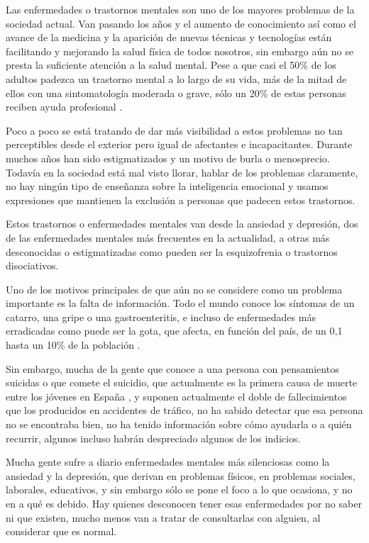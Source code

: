 \documentclass[12pt, a4paper,twoside,titlepage]{book}
\begin{document}
Las enfermedades o trastornos mentales son uno de los mayores problemas de la sociedad actual. Van pasando los años y el aumento de conocimiento así como el avance de la medicina y la aparición de nuevas técnicas y tecnologías están facilitando y mejorando la salud física de todos nosotros, sin embargo aún no se presta la suficiente atención a la salud mental. Pese a que casi el 50\% de los adultos padezca un trastorno mental a lo largo de su vida, más de la mitad de ellos con una sintomatología moderada o grave, sólo un 20\% de estas personas reciben ayuda profesional \cite{articuloIntro1}. 

Poco a poco se está tratando de dar más visibilidad a estos problemas no tan perceptibles desde el exterior pero igual de afectantes e incapacitantes. Durante muchos años han sido estigmatizados y un motivo de burla o menosprecio. Todavía en la sociedad está mal visto llorar, hablar de los problemas claramente, no hay ningún tipo de enseñanza sobre la inteligencia emocional y usamos expresiones que mantienen la exclusión a personas que padecen estos trastornos.  

Estos trastornos o enfermedades mentales van desde la ansiedad y depresión, dos de las enfermedades mentales más frecuentes en la actualidad, a otras más desconocidas o estigmatizadas como pueden ser la esquizofrenia o trastornos disociativos. 

Uno de los motivos principales de que aún no se considere como un problema importante es la falta de información. Todo el mundo conoce los síntomas de un catarro, una gripe o una gastroenteritis, e incluso de enfermedades más erradicadas como puede ser la gota, que afecta, en función del país, de un 0,1 hasta un 10\% de la población \cite{articuloIntro2}. 

Sin embargo, mucha de la gente que conoce a una persona con pensamientos suicidas o que comete el suicidio, que actualmente es la primera causa de muerte entre los jóvenes en España \cite{fundacionSuicidio}, y suponen actualmente el doble de fallecimientos que los producidos en accidentes de tráfico, no ha sabido detectar que esa persona no se encontraba bien, no ha tenido información sobre cómo ayudarla o a quién recurrir, algunos incluso habrán despreciado algunos de los indicios. 

Mucha gente sufre a diario enfermedades mentales más silenciosas como la ansiedad y la depresión, que derivan en problemas físicos, en problemas sociales, laborales, educativos, y sin embargo sólo se pone el foco a lo que ocasiona, y no en a qué es debido. Hay quienes desconocen tener esas enfermedades por no saber ni que existen, mucho menos van a tratar de consultarlas con alguien, al considerar que es normal. 
\end{document}
